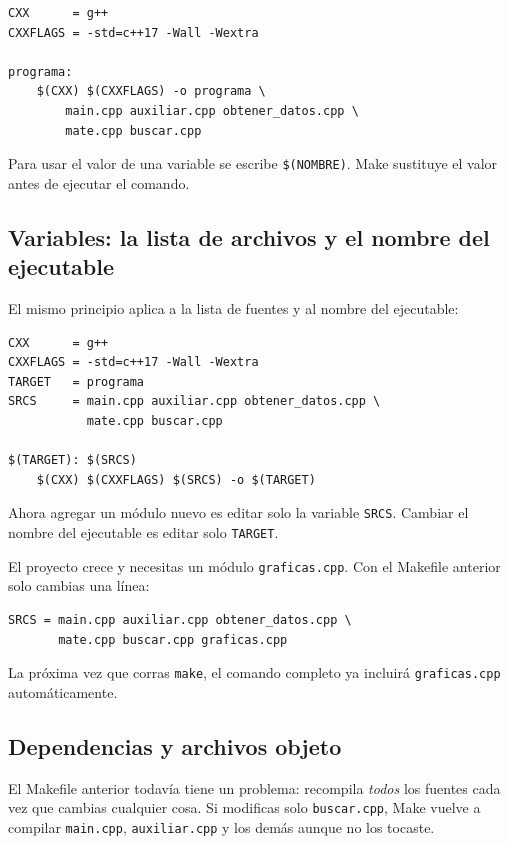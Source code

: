 \documentclass[12pt, oneside]{article}
\begin{document}
\begin{verbatim}
CXX      = g++
CXXFLAGS = -std=c++17 -Wall -Wextra

programa:
	$(CXX) $(CXXFLAGS) -o programa \
	    main.cpp auxiliar.cpp obtener_datos.cpp \
	    mate.cpp buscar.cpp
\end{verbatim}

Para usar el valor de una variable se escribe \texttt{\$(NOMBRE)}.
Make sustituye el valor antes de ejecutar el comando.

\subsection{Variables: la lista de archivos y el nombre del ejecutable}

El mismo principio aplica a la lista de fuentes y al nombre del ejecutable:

\begin{verbatim}
CXX      = g++
CXXFLAGS = -std=c++17 -Wall -Wextra
TARGET   = programa
SRCS     = main.cpp auxiliar.cpp obtener_datos.cpp \
           mate.cpp buscar.cpp

$(TARGET): $(SRCS)
	$(CXX) $(CXXFLAGS) $(SRCS) -o $(TARGET)
\end{verbatim}

Ahora agregar un módulo nuevo es editar solo la variable \texttt{SRCS}.
Cambiar el nombre del ejecutable es editar solo \texttt{TARGET}.

\begin{ejemplo}[Agregar un módulo nuevo]
  El proyecto crece y necesitas un módulo \texttt{graficas.cpp}.
  Con el Makefile anterior solo cambias una línea:
  \begin{verbatim}
SRCS = main.cpp auxiliar.cpp obtener_datos.cpp \
       mate.cpp buscar.cpp graficas.cpp
  \end{verbatim}
  La próxima vez que corras \texttt{make}, el comando completo ya
  incluirá \texttt{graficas.cpp} automáticamente.
\end{ejemplo}

\subsection{Dependencias y archivos objeto}

El Makefile anterior todavía tiene un problema: recompila \textit{todos}
los fuentes cada vez que cambias cualquier cosa.  Si modificas solo
\texttt{buscar.cpp}, Make vuelve a compilar \texttt{main.cpp},
\texttt{auxiliar.cpp} y los demás aunque no los tocaste.
\end{document}
